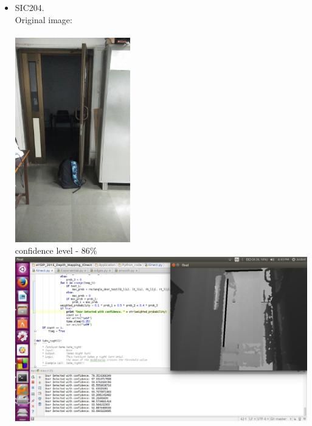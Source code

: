 \documentclass{report}
\begin{document}
\begin{itemize}
 \item SIC204. \\
 Original image: \\ \\
 \includegraphics[width = 5cm]{SIC204.jpg} \\
 confidence level - 86\% \\ 
 \includegraphics[width = 15cm]{confidence_204.png} \\
 

\end{itemize}
\end{document}
